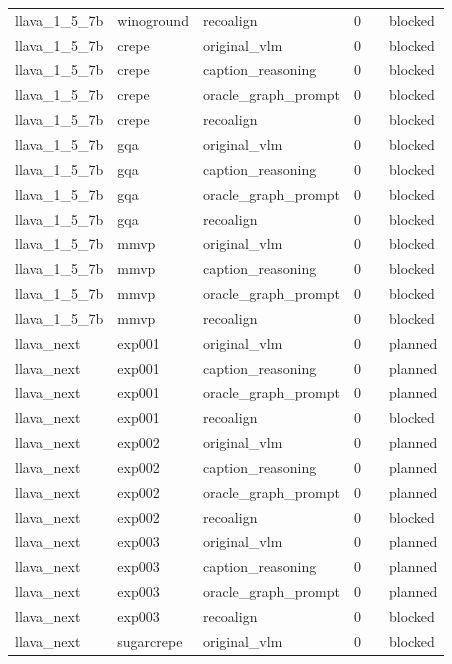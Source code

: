 \begin{table}[t]
\begin{tabular}{llllll}
llava\_1\_5\_7b & winoground & recoalign & 0 &  & blocked \\
llava\_1\_5\_7b & crepe & original\_vlm & 0 &  & blocked \\
llava\_1\_5\_7b & crepe & caption\_reasoning & 0 &  & blocked \\
llava\_1\_5\_7b & crepe & oracle\_graph\_prompt & 0 &  & blocked \\
llava\_1\_5\_7b & crepe & recoalign & 0 &  & blocked \\
llava\_1\_5\_7b & gqa & original\_vlm & 0 &  & blocked \\
llava\_1\_5\_7b & gqa & caption\_reasoning & 0 &  & blocked \\
llava\_1\_5\_7b & gqa & oracle\_graph\_prompt & 0 &  & blocked \\
llava\_1\_5\_7b & gqa & recoalign & 0 &  & blocked \\
llava\_1\_5\_7b & mmvp & original\_vlm & 0 &  & blocked \\
llava\_1\_5\_7b & mmvp & caption\_reasoning & 0 &  & blocked \\
llava\_1\_5\_7b & mmvp & oracle\_graph\_prompt & 0 &  & blocked \\
llava\_1\_5\_7b & mmvp & recoalign & 0 &  & blocked \\
llava\_next & exp001 & original\_vlm & 0 &  & planned \\
llava\_next & exp001 & caption\_reasoning & 0 &  & planned \\
llava\_next & exp001 & oracle\_graph\_prompt & 0 &  & planned \\
llava\_next & exp001 & recoalign & 0 &  & blocked \\
llava\_next & exp002 & original\_vlm & 0 &  & planned \\
llava\_next & exp002 & caption\_reasoning & 0 &  & planned \\
llava\_next & exp002 & oracle\_graph\_prompt & 0 &  & planned \\
llava\_next & exp002 & recoalign & 0 &  & blocked \\
llava\_next & exp003 & original\_vlm & 0 &  & planned \\
llava\_next & exp003 & caption\_reasoning & 0 &  & planned \\
llava\_next & exp003 & oracle\_graph\_prompt & 0 &  & planned \\
llava\_next & exp003 & recoalign & 0 &  & blocked \\
llava\_next & sugarcrepe & original\_vlm & 0 &  & blocked \\

\end{tabular}
\end{table}

